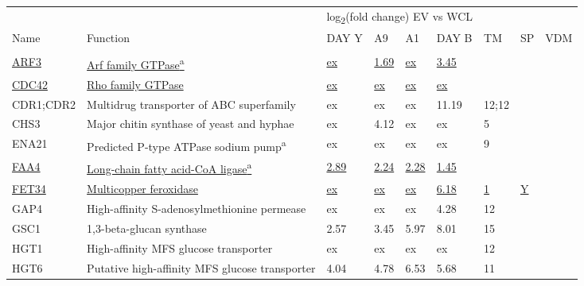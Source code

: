 \begin{ThreePartTable}
\begin{longtable}[t]{lllllllll}
\toprule
\multicolumn{2}{c}{ } & \multicolumn{4}{c}{log\textsubscript{2}(fold change) EV vs WCL} & \multicolumn{2}{c}{ } \\
\cmidrule(l{3pt}r{3pt}){3-6}
Name & Function & DAY Y & A9 & A1 & DAY B & TM & SP & VDM\\
\midrule
\addlinespace[0.3em]
\multicolumn{9}{l}{\textbf{Plasma membrane}}\\
\hspace{1em}\underline{ARF3} & \underline{Arf family GTPase\textsuperscript{a}} & \underline{ex} & \underline{1.69} & \underline{ex} & \underline{3.45} & \underline{} & \underline{} & \underline{}\\
\hspace{1em}\underline{CDC42} & \underline{Rho family GTPase} & \underline{ex} & \underline{ex} & \underline{ex} & \underline{ex} & \underline{} & \underline{} & \underline{}\\
\hspace{1em}CDR1;CDR2 & Multidrug transporter of ABC superfamily & ex & ex & ex & 11.19 & 12;12 &  & \\
\hspace{1em}CHS3 & Major chitin synthase of yeast and hyphae & ex & 4.12 & ex & ex & 5 &  & \\
\hspace{1em}ENA21 & Predicted P-type ATPase sodium pump\textsuperscript{a} & ex & ex & ex & ex & 9 &  & \\
\hspace{1em}\underline{FAA4} & \underline{Long-chain fatty acid-CoA ligase\textsuperscript{a}} & \underline{2.89} & \underline{2.24} & \underline{2.28} & \underline{1.45} & \underline{} & \underline{} & \underline{}\\
\hspace{1em}\underline{FET34} & \underline{Multicopper feroxidase} & \underline{ex} & \underline{ex} & \underline{ex} & \underline{6.18} & \underline{1} & \underline{Y} & \underline{}\\
\hspace{1em}GAP4 & High-affinity S-adenosylmethionine permease & ex & ex & ex & 4.28 & 12 &  & \\
\hspace{1em}GSC1 & 1,3-beta-glucan synthase & 2.57 & 3.45 & 5.97 & 8.01 & 15 &  & \\
\hspace{1em}HGT1 & High-affinity MFS glucose transporter & ex & ex & ex & ex & 12 &  & \\
\hspace{1em}HGT6 & Putative high-affinity MFS glucose transporter & 4.04 & 4.78 & 6.53 & 5.68 & 11 &  & \\

\end{longtable}
\end{ThreePartTable}
